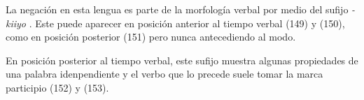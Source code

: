 La negación en esta lengua es parte de la morfología verbal por medio del sufijo {\setmainfont{Charis SIL} \textit{-kiiyo}} \textcolor{MidnightBlue}{\citep{choctaw}}. Este puede aparecer en posición anterior al tiempo verbal (149) y (150), como en posición posterior (151) pero nunca antecediendo al modo.

En posición posterior al tiempo verbal, este sufijo muestra algunas propiedades de una palabra idenpendiente y el verbo que lo precede suele tomar la marca participio (152) y (153).